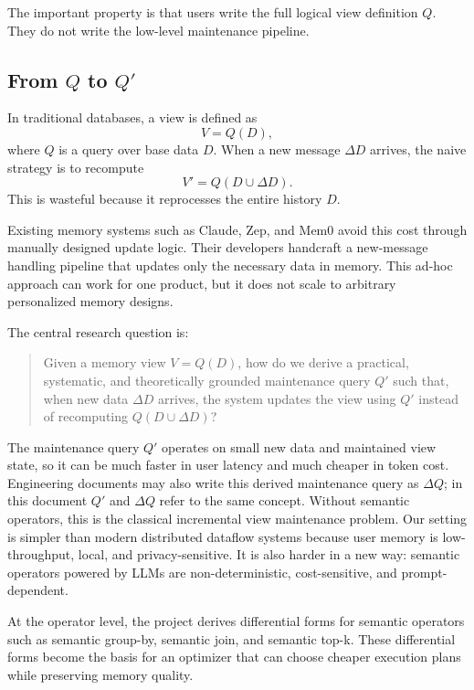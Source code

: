 \documentclass[11pt]{article}
\newcommand{\D}{D}
\newcommand{\V}{V}
\newcommand{\Q}{Q}
\newcommand{\DQ}{Q'}
\newcommand{\DeltaD}{\Delta D}
\begin{document}
The important property is that users write the full logical view definition
\(\Q\). They do not write the low-level maintenance pipeline.

\subsection{From \texorpdfstring{\(\Q\)}{Q} to \texorpdfstring{\(\DQ\)}{Q'}}

In traditional databases, a view is defined as
\[
  \V = \Q(\D),
\]
where \(\Q\) is a query over base data \(\D\). When a new message
\(\DeltaD\) arrives, the naive strategy is to recompute
\[
  \V' = \Q(\D \cup \DeltaD).
\]
This is wasteful because it reprocesses the entire history \(\D\).

Existing memory systems such as Claude, Zep, and Mem0 avoid this cost through
manually designed update logic. Their developers handcraft a new-message
handling pipeline that updates only the necessary data in memory. This ad-hoc
approach can work for one product, but it does not scale to arbitrary
personalized memory designs.

The central research question is:

\begin{quote}
Given a memory view \(\V=\Q(\D)\), how do we derive a practical, systematic,
and theoretically grounded maintenance query \(\DQ\) such that, when new data
\(\DeltaD\) arrives, the system updates the view using \(\DQ\) instead of
recomputing \(\Q(\D \cup \DeltaD)\)?
\end{quote}

The maintenance query \(\DQ\) operates on small new data and maintained view
state, so it can be much faster in user latency and much cheaper in token cost.
Engineering documents may also write this derived maintenance query as
\(\Delta Q\); in this document \(\DQ\) and \(\Delta Q\) refer to the same
concept.
Without semantic operators, this is the classical incremental view maintenance
problem. Our setting is simpler than modern distributed dataflow systems
because user memory is low-throughput, local, and privacy-sensitive. It is also
harder in a new way: semantic operators powered by LLMs are non-deterministic,
cost-sensitive, and prompt-dependent.

At the operator level, the project derives differential forms for semantic
operators such as semantic group-by, semantic join, and semantic top-k. These
differential forms become the basis for an optimizer that can choose cheaper
execution plans while preserving memory quality.
\end{document}
